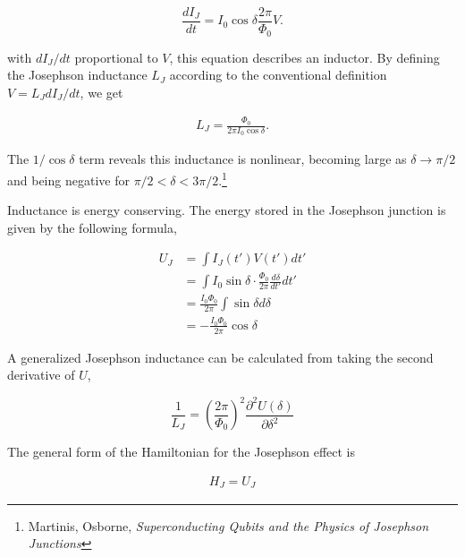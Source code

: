 \documentclass[svgnames]{article}     %
\begin{document}
\[
\frac{d I_J}{d t} = I_0 \cos \delta \frac{2\pi}{\Phi_0} V.
\] \vspace{3px}

with $dI_J / dt$ proportional to $V$, this equation describes an inductor. By
defining the Josephson inductance $L_J$ according to the conventional
definition $V = L_J dI_J / dt$, we get 

\vspace{5px}
\begin{tcolorbox}
  \vspace{-10px}
  \begin{align} \label{}
    L_J = \frac{\Phi_0}{2\pi I_0 \cos \delta}. 
  \end{align}
\end{tcolorbox}
\vspace{5px}

The  $1 / \cos \delta$ term reveals this inductance is nonlinear, becoming
large as $\delta \rightarrow \pi /2$ and being negative for $\pi / 2 < \delta
< 3 \pi / 2$.\footnote{Martinis, Osborne, \textit{Superconducting Qubits and the Physics of Josephson
Junctions}}

Inductance is energy conserving. The energy stored in the Josephson junction is
given by the following formula, 

\begin{align} \label{jospephpotential}
  U_J &= \int I_J(t')V(t') dt' \nonumber \\ 
      &= \int I_0 \sin \delta \cdot \frac{\Phi_0}{2\pi} \frac{d \delta }{d t'} dt'
      \nonumber \\ 
      &= \frac{I_0 \Phi_0}{2\pi} \int \sin \delta d\delta \nonumber \\ 
      &= -\frac{I_0\Phi_0}{2\pi} \cos \delta
\end{align}\vspace{3px}


A generalized Josephson inductance can be calculated from taking the second
derivative of $U$, 

\[
\frac{1}{L_J} = \left( \frac{2\pi}{\Phi_0} \right) ^2 \frac{\partial^2
U(\delta)}{\partial \delta^2}  
\] \vspace{3px}


The general form of the Hamiltonian for the Josephson effect is 

 \begin{align} \label{}
  H_J = U_J
\end{align}\vspace{3px}
\end{document}
